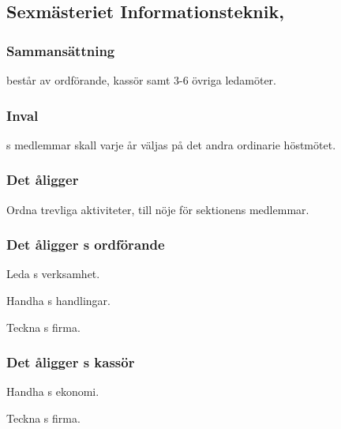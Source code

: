 \subsection{Sexmästeriet Informationsteknik, \SEXIT}
\subsubsection{Sammansättning}
\SEXIT{} består av ordförande, kassör samt 3-6 övriga ledamöter.

\subsubsection{Inval}
\SEXIT{}s medlemmar skall varje år väljas på det andra ordinarie höstmötet.

\subsubsection{Det åligger \SEXIT}
\begin{att}
	\item Ordna trevliga aktiviteter, till nöje för sektionens medlemmar.
\end{att}

\subsubsection{Det åligger \SEXIT{}s ordförande}
\begin{att}
	\item Leda \SEXIT{}s verksamhet.
	\item Handha \SEXIT{}s handlingar.
	\item Teckna \SEXIT{}s firma.
\end{att}

\subsubsection{Det åligger \SEXIT{}s kassör}
\begin{att}
	\item Handha \SEXIT{}s ekonomi.
	\item Teckna \SEXIT{}s firma.
\end{att}